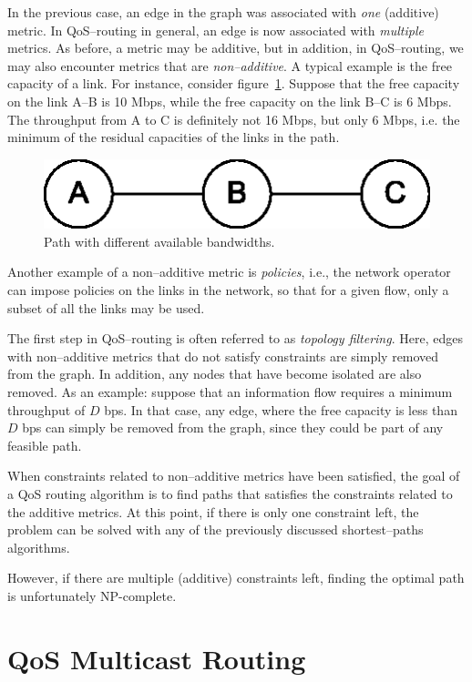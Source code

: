 \documentclass[a4paper]{article}
\newcommand{\ie}{i.e.,\xspace}
\begin{document}
In the previous case, an edge in the graph was associated with
\emph{one} (additive) metric. In QoS--routing in general, an edge is now associated with \emph{multiple} metrics. As before, a metric may be additive, but in addition, in QoS--routing, we may also encounter metrics that are
\emph{non--additive}. A typical example is the free capacity
of a link. For instance, consider figure~\ref{fig:ResidualCapacityExample}. Suppose that the free capacity on the link A--B is 10 Mbps, while the free capacity on the link B--C is 6 Mbps. The throughput from A to C is definitely not 16 Mbps, but only 6 Mbps, i.e. the minimum of the residual capacities of the links in the path.
\begin{figure}[ht]
\centering
\includegraphics{ResidualCapacityExample.eps}
\caption{\label{fig:ResidualCapacityExample}Path with different
available bandwidths.}
\end{figure}

Another example of a non--additive metric is \emph{policies}, \ie
the network operator can impose policies on the links in the
network, so that for a given flow, only a subset of all the links
may be used.

The first step in QoS--routing is often referred to as \emph{topology filtering}. Here, edges with non--additive metrics that do not satisfy constraints are simply removed from the graph. In addition, any nodes that have become isolated are also removed. As an example: suppose that an information flow requires a minimum throughput of $D$ bps. In that case, any edge, where the free capacity is less than $D$ bps can simply be removed from the graph, since they could be part of any feasible path.

When constraints related to non--additive metrics have been
satisfied, the goal of a QoS routing algorithm is to find paths
that satisfies the constraints related to the additive metrics. At
this point, if there is only one constraint left, the problem can
be solved with any of the previously discussed shortest--paths
algorithms.

However, if there are multiple (additive) constraints left, finding the
optimal path is unfortunately NP-complete.




\section{\label{sec:M-QoSR}QoS Multicast Routing}
\end{document}
